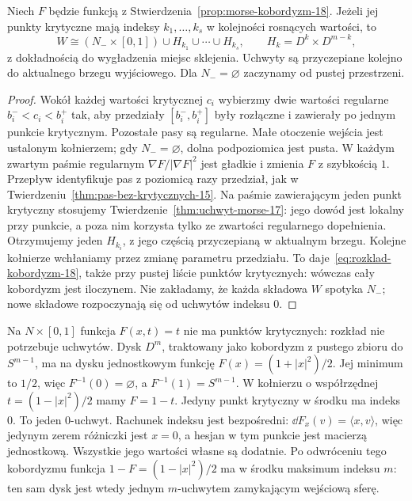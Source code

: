 \begin{twierdzenie}
\label{thm:rozklad-uchwyty-18}
Niech $F$ będzie funkcją z
Stwierdzenia~\ref{prop:morse-kobordyzm-18}.
Jeżeli jej punkty krytyczne mają indeksy
$k_1,\ldots,k_s$ w kolejności rosnących
wartości, to
\begin{equation}\label{eq:rozklad-kobordyzm-18}
 W\cong
 (N_-\times[0,1])\cup H_{k_1}\cup\cdots\cup H_{k_s},
 \qquad H_k=D^k\times D^{m-k},
\end{equation}
z dokładnością do wygładzenia miejsc sklejenia.
Uchwyty są przyczepiane kolejno do aktualnego
brzegu wyjściowego. Dla $N_-=\varnothing$
zaczynamy od pustej przestrzeni.
\end{twierdzenie}
\begin{proof}
Wokół każdej wartości krytycznej $c_i$ wybierzmy
dwie wartości regularne $b_i^-<c_i<b_i^+$ tak, aby
przedziały $[b_i^-,b_i^+]$ były rozłączne i zawierały
po jednym punkcie krytycznym. Pozostałe pasy są regularne.
Małe otoczenie wejścia jest ustalonym kołnierzem;
gdy $N_-=\varnothing$, dolna podpoziomica jest pusta.
W każdym zwartym paśmie regularnym
$\nabla F/|\nabla F|^2$ jest gładkie i zmienia $F$
z szybkością $1$. Przepływ identyfikuje pas
z poziomicą razy przedział, jak w
Twierdzeniu~\ref{thm:pas-bez-krytycznych-15}.
Na paśmie zawierającym jeden punkt krytyczny
stosujemy Twierdzenie~\ref{thm:uchwyt-morse-17}:
jego dowód jest lokalny przy punkcie, a poza nim
korzysta tylko ze zwartości regularnego dopełnienia.
Otrzymujemy jeden $H_{k_i}$, z jego częścią przyczepianą
w aktualnym brzegu. Kolejne kołnierze wchłaniamy
przez zmianę parametru przedziału.
To daje~\eqref{eq:rozklad-kobordyzm-18}, także przy
pustej liście punktów krytycznych: wówczas cały
kobordyzm jest iloczynem. Nie zakładamy, że każda
składowa $W$ spotyka $N_-$; nowe składowe rozpoczynają
się od uchwytów indeksu $0$.
\end{proof}

\begin{przyklad}
Na $N\times[0,1]$ funkcja $F(x,t)=t$
nie ma punktów krytycznych: rozkład nie
potrzebuje uchwytów. Dysk $D^m$, traktowany
jako kobordyzm z pustego zbioru do
$S^{m-1}$, ma na dysku jednostkowym funkcję
$F(x)=(1+|x|^2)/2$. Jej minimum to $1/2$,
więc $F^{-1}(0)=\varnothing$, a $F^{-1}(1)=S^{m-1}$.
W kołnierzu o współrzędnej $t=(1-|x|^2)/2$
mamy $F=1-t$. Jedyny punkt krytyczny w środku
ma indeks $0$.
To jeden $0$-uchwyt.
Rachunek indeksu jest bezpośredni: $\dd F_x(v)=\langle x,v\rangle$,
więc jedynym zerem różniczki jest $x=0$, a hesjan w tym punkcie
jest macierzą jednostkową. Wszystkie jego wartości własne są dodatnie.
Po odwróceniu tego kobordyzmu funkcja $1-F=(1-|x|^2)/2$
ma w środku maksimum indeksu $m$: ten sam dysk jest wtedy
jednym $m$-uchwytem zamykającym wejściową sferę.
\end{przyklad}

